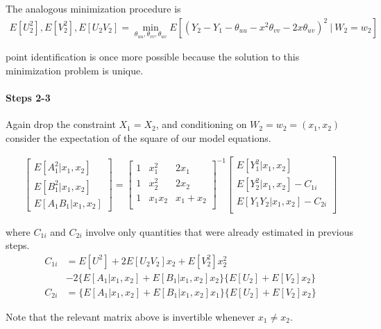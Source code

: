 \noindent The analogous minimization procedure is
\begin{align}
E[U_2^2], E[V_2^2], E[U_2V_2] =
  \min_{\theta_{uu}, \theta_{vv}, \theta_{uv}}  
  E[(Y_{2} - Y_{1} - \theta_{uu} -  x^2\theta_{vv} - 2x\theta_{uv})^2 \  | \ W_2 = w_2]
\end{align}

\noindent point identification is once more possible because the solution to this minimization problem is unique.

\paragraph{Steps 2-3} Again drop the constraint $X_1 = X_2$, and conditioning on $W_2 = w_2 = (x_1, x_2)$ consider the expectation of the square of our model equations.

\begin{align}
\begin{bmatrix}
  E[A_1^2 | x_{1}, x_{2}] \\ 
  E[B_1^2 | x_{1}, x_{2}]  \\ 
  E[A_1 B_1 | x_{1}, x_{2}]
\end{bmatrix}
=
\begin{bmatrix}
  1 & x_{1}^2 & 2x_{1} \\ 
  1 & x_{2}^2 & 2x_{2} \\ 
  1 & x_{1}x_{2} & x_{1} + x_{2} \\ 
\end{bmatrix}^{-1}
\begin{bmatrix}
  E[Y_1^2 | x_{1}, x_{2}] \\
  E[Y_2^2 | x_{1}, x_{2}] - C_{1i} \\
  E[Y_1 Y_2 | x_{1}, x_{2}] - C_{2i} \\
\end{bmatrix}
\end{align}

\noindent where $C_{1i}$ and $C_{2i}$ involve only quantities that were already estimated in previous steps.
\begin{align}
C_{1i} &= E[U^2] + 2E[U_2 V_2] x_{2} +  E[V_2^2]x_{2}^2 \\
      &- 2\{
E[A_1 | x_{1}, x_{2}] +
E[B_1 | x_{1}, x_{2}]x_{2}
\}
\{
E[U_2] + E[V_2]x_{2}
\}
\\
C_{2i} &= 
\{ 
  E[A_1 | x_{1}, x_{2}] + E[B_1 | x_{1}, x_{2}]x_{1}
\}
\{
E[U_2] + E[V_2]x_{2}
\}
\end{align}

Note that the relevant matrix above is invertible whenever $x_1 \neq x_2$. 

